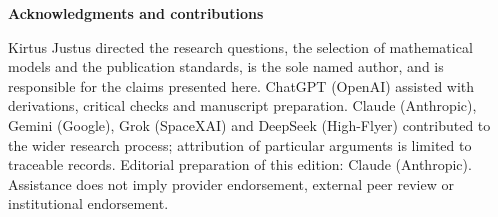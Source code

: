 \documentclass[11pt,a4paper]{article}
\begin{document}
\vspace{3mm}\textbf{Acknowledgments and contributions}\par
{\small Kirtus Justus directed the research questions, the selection of mathematical models and the publication standards, is the sole named author, and is responsible for the claims presented here. ChatGPT (OpenAI) assisted with derivations, critical checks and manuscript preparation. Claude (Anthropic), Gemini (Google), Grok (SpaceXAI) and DeepSeek (High-Flyer) contributed to the wider research process; attribution of particular arguments is limited to traceable records. Editorial preparation of this edition: Claude (Anthropic). Assistance does not imply provider endorsement, external peer review or institutional endorsement.\par}
\end{document}
